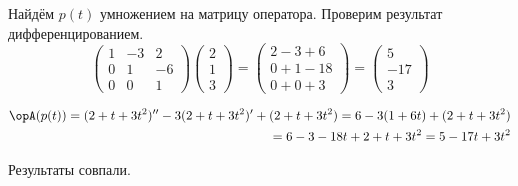 Найдём \(p(t)\) умножением на матрицу оператора.
Проверим результат дифференцированием.
\[
  \begin{pmatrix}
    1 & -3 & 2\\
    0 & 1 & -6\\
    0 & 0 & 1
  \end{pmatrix}
  \begin{pmatrix} 2\\ 1\\ 3 \end{pmatrix}
  =
  \begin{pmatrix}
      2 - 3 + 6 \\
      0 + 1 - 18 \\
      0 + 0 + 3
  \end{pmatrix}
  =
  \begin{pmatrix} 5 \\ -17 \\ 3 \end{pmatrix}
\]

\[
\begin{split}
  \opA(p(t))
  = (2 + t + 3t^2)^{\prime\prime}
  - 3(2 + t + 3t^2)^\prime
  + (2 + t + 3t^2)
  = 6 - 3(1 + 6t) + (2 + t + 3t^2) \\
  = 6 - 3 - 18t + 2 + t + 3t^2
  = 5 - 17t + 3t^2
\end{split}
\]

Результаты совпали.
